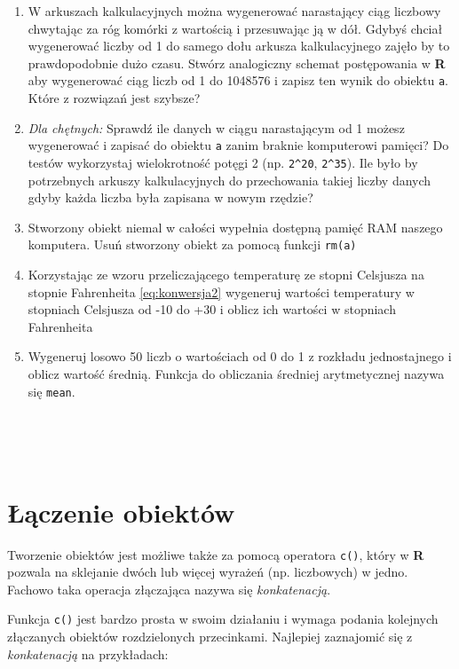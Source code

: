 \documentclass[]{book}
\theoremstyle{definition}
\theoremstyle{definition}
\theoremstyle{definition}
\theoremstyle{remark}
\begin{document}
\begin{enumerate}
\def\labelenumi{\arabic{enumi}.}
\item
  W arkuszach kalkulacyjnych można wygenerować narastający ciąg liczbowy
  chwytając za róg komórki z wartością i przesuwając ją w dół. Gdybyś
  chciał wygenerować liczby od 1 do samego dołu arkusza kalkulacyjnego
  zajęło by to prawdopodobnie dużo czasu. Stwórz analogiczny schemat
  postępowania w \textbf{R} aby wygenerować ciąg liczb od 1 do 1048576 i
  zapisz ten wynik do obiektu \texttt{a}. Które z rozwiązań jest
  szybsze?
\item
  \emph{Dla chętnych:} Sprawdź ile danych w ciągu narastającym od 1
  możesz wygenerować i zapisać do obiektu \texttt{a} zanim braknie
  komputerowi pamięci? Do testów wykorzystaj wielokrotność potęgi 2 (np.
  \texttt{2\^{}20}, \texttt{2\^{}35}). Ile było by potrzebnych arkuszy
  kalkulacyjnych do przechowania takiej liczby danych gdyby każda liczba
  była zapisana w nowym rzędzie?
\item
  Stworzony obiekt niemal w całości wypełnia dostępną pamięć RAM naszego
  komputera. Usuń stworzony obiekt za pomocą funkcji \texttt{rm(a)}
\item
  Korzystając ze wzoru przeliczającego temperaturę ze stopni Celsjusza
  na stopnie Fahrenheita \eqref{eq:konwersja2} wygeneruj wartości
  temperatury w stopniach Celsjusza od -10 do +30 i oblicz ich wartości
  w stopniach Fahrenheita
\item
  Wygeneruj losowo 50 liczb o wartościach od 0 do 1 z rozkładu
  jednostajnego i oblicz wartość średnią. Funkcja do obliczania średniej
  arytmetycznej nazywa się \texttt{mean}.
\end{enumerate}

~

~

\section{Łączenie obiektów}\label{aczenie-obiektow}

Tworzenie obiektów jest możliwe także za pomocą operatora \texttt{c()},
który w \textbf{R} pozwala na sklejanie dwóch lub więcej wyrażeń (np.
liczbowych) w jedno. Fachowo taka operacja złączająca nazywa się
\emph{konkatenacją}.

Funkcja \texttt{c()} jest bardzo prosta w swoim działaniu i wymaga
podania kolejnych złączanych obiektów rozdzielonych przecinkami.
Najlepiej zaznajomić się z \emph{konkatenacją} na przykładach:
\end{document}
